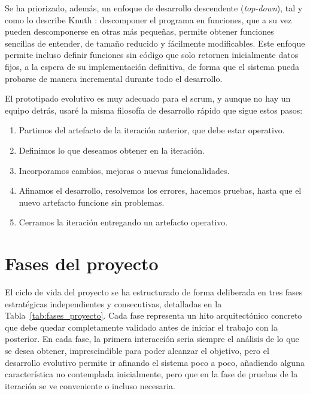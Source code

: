 \documentclass[../main.tex]{subfiles}
\begin{document}
Se ha priorizado, además, un enfoque de desarrollo descendente (\textit{top-down}), tal y como lo describe Knuth \cite{knuth1_es}: descomponer el programa en funciones, que a su vez pueden descomponerse en otras más pequeñas, permite obtener funciones sencillas de entender, de tamaño reducido y fácilmente modificables. Este enfoque permite incluso definir funciones sin código que solo retornen inicialmente datos fijos, a la espera de su implementación definitiva, de forma que el sistema pueda probarse de manera incremental durante todo el desarrollo.

El prototipado evolutivo es muy adecuado para el scrum, y aunque no hay un equipo detrás, usaré la misma filosofía de desarrollo rápido que sigue estos pasos:

\begin{enumerate}
	\item Partimos del artefacto de la iteración anterior, que debe estar operativo.
	\item Definimos lo que deseamos obtener en la iteración.
	\item Incorporamos cambios, mejoras o nuevas funcionalidades.
	\item Afinamos el desarrollo, resolvemos los errores, hacemos pruebas, hasta que el nuevo artefacto funcione sin problemas.
	\item Cerramos la iteración entregando un artefacto operativo.
\end{enumerate}

\section{Fases del proyecto}
\label{sec:fases}

El ciclo de vida del proyecto se ha estructurado de forma deliberada en tres fases estratégicas independientes y consecutivas, detalladas en la Tabla~\ref{tab:fases_proyecto}. Cada fase representa un hito arquitectónico concreto que debe quedar completamente validado antes de iniciar el trabajo con la posterior. En cada fase, la primera interacción seria siempre el análisis de lo que se desea obtener, imprescindible para poder alcanzar el objetivo, pero el desarrollo evolutivo permite ir afinando el sistema poco a poco, añadiendo alguna característica no contemplada inicialmente, pero que en la fase de pruebas de la iteración se ve conveniente o incluso necesaria.
\end{document}
